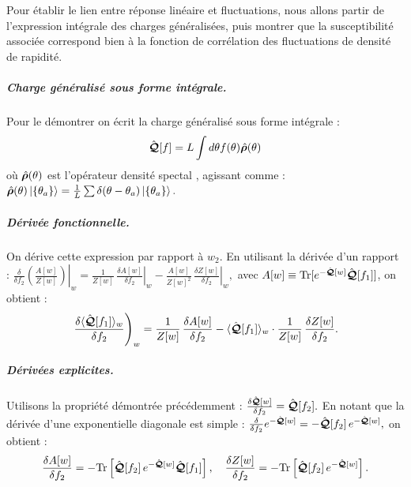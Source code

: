Pour établir le lien entre réponse linéaire et fluctuations, nous allons partir de l'expression intégrale des charges généralisées, puis montrer que la susceptibilité associée correspond bien à la fonction de corrélation des fluctuations de densité de rapidité.


\subparagraph{Charge généralisé sous forme intégrale.}
Pour le démontrer on écrit la charge généralisé sous forme intégrale : 
\begin{eqnarray*}
\hat{\bm{\mathcal{Q}}}[f] = L\int d\theta f(\theta) \hat{\bm{\rho}}(\theta)
\end{eqnarray*}
où $\hat{\bm{\rho}}(\theta)$ est l'opérateur densité spectal , agissant comme :
\(
\hat{\bm{\rho}}(\theta) \ket{ \{ \theta_a \} } = \frac{1}{L} \sum \delta ( \theta - \theta_a ) \ket{ \{ \theta_a \} }.
\)

\subparagraph{Dérivée fonctionnelle.}
On dérive cette expression par rapport à $w_2$. En utilisant la dérivée d’un rapport :
\(
	\left.\frac{\delta}{\delta f_2} \left( \frac{A[w]}{Z[w]} \right) \right |_{w} = \frac{1}{Z[w]}\, \left.\frac{\delta A[w]}{\delta f_2} \right|_{w} - \frac{A[w]}{Z[w]^2}\, \left.\frac{\delta Z[w]}{\delta f_2}\right|_{w} ,
\)
avec $A[w] \equiv \mathrm{Tr}[e^{-\hat{\bm{\mathcal{Q}}}[w]} \hat{\bm{\mathcal{Q}}}[f_1]]$, on obtient :
\begin{eqnarray*}
	\left . \frac{\delta \langle \hat{\bm{\mathcal{Q}}}[f_1] \rangle_w}{\delta f_2} \right )_w
	= \frac{1}{Z[w]}\, \frac{\delta A[w]}{\delta f_2}
	- \langle \hat{\bm{\mathcal{Q}}}[f_1] \rangle_w \cdot \frac{1}{Z[w]}\, \frac{\delta Z[w]}{\delta f_2}.
\end{eqnarray*}

\subparagraph{Dérivées explicites.}
Utilisons la propriété démontrée précédemment :
\(
	\frac{\delta \hat{\bm{\mathcal{Q}}}[w]}{\delta f_2} = \hat{\bm{\mathcal{Q}}}[f_2]	.
\)
En notant que la dérivée d’une exponentielle diagonale est simple :
\(
\frac{\delta}{\delta f_2} e^{-\hat{\bm{\mathcal{Q}}}[w]} = - \hat{\bm{\mathcal{Q}}}[f_2]\, e^{-\hat{\bm{\mathcal{Q}}}[w]},
\)
on obtient :
\begin{eqnarray*}
\frac{\delta A[w]}{\delta f_2} = - \mathrm{Tr}\left[ \hat{\bm{\mathcal{Q}}}[f_2]\, e^{-\hat{\bm{\mathcal{Q}}}[w]} \hat{\bm{\mathcal{Q}}}[f_1] \right],
\quad
\frac{\delta Z[w]}{\delta f_2} = - \mathrm{Tr}\left[ \hat{\bm{\mathcal{Q}}}[f_2]\, e^{-\hat{\bm{\mathcal{Q}}}[w]} \right].
\end{eqnarray*}

